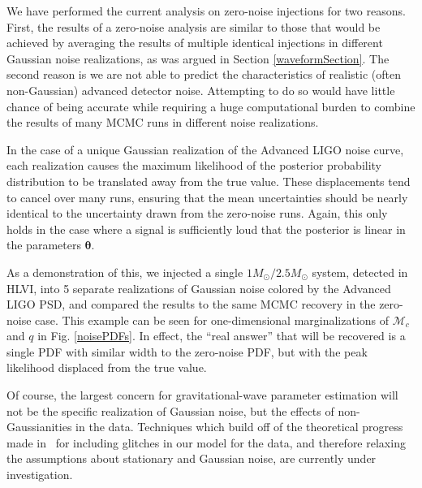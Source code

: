 \documentclass[11pt,a4paper]{emulateapj} 
\newcommand{\thpara}{\boldsymbol{\theta}}
\newcommand{\chmass}{\mathcal{M}_c}
\begin{document}
We have performed the current analysis on zero-noise injections for
two reasons.  First, the results of a zero-noise analysis are
similar to those that would be achieved by averaging the results of
multiple identical injections in different Gaussian noise
realizations, as was argued in Section \ref{waveformSection}.  The second reason 
is we are not able
to predict the characteristics of realistic (often non-Gaussian)
advanced detector noise.  Attempting to do so would have little chance
of being accurate while requiring a huge computational burden to
combine the results of many MCMC runs in different noise realizations.

In the case of a unique Gaussian realization of the Advanced LIGO
noise curve, each realization causes the maximum likelihood of the
posterior probability distribution to be translated away from the true
value.  These displacements tend to cancel 
    over many runs, ensuring that the mean uncertainties should be nearly identical to 
   the uncertainty drawn from the zero-noise runs.  Again, this only holds in the case
  where a signal is sufficiently loud that the posterior is linear in the parameters 
  $\thpara$.

As a demonstration of this, we injected a single
$1M_{\odot}/2.5M_{\odot}$ system, detected in HLVI, into 5 separate
realizations of Gaussian noise colored by the Advanced LIGO PSD, and
compared the results to the same MCMC recovery in the zero-noise case.
This example can be seen for one-dimensional marginalizations of
$\chmass$ and $q$ in Fig. \ref{noisePDFs}.  In effect, the ``real
answer'' that will be recovered is a single PDF with similar width to
the zero-noise PDF, but with the peak likelihood displaced from the
true value.

Of course, the largest concern for gravitational-wave parameter
estimation will not be the specific realization of Gaussian noise, but
the effects of non-Gaussianities in the data.  Techniques which build
off of the theoretical progress made
in~\cite{Allen:2002jw,Rover:2011qd,Littenberg:2010gf} for including
glitches in our model for the data, and therefore relaxing the
assumptions about stationary and Gaussian noise, are currently under
investigation.
\end{document}
